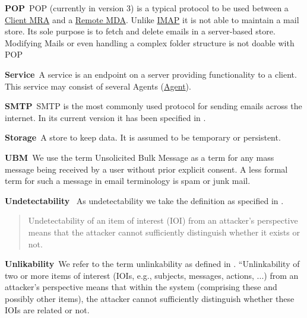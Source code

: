 \documentclass[a4paper,appendixprefix,pdfusetitle,twocolumn,fontsize=8pt,draft,DIV=calc]{scrbook}
\newenvironment{entry}{\par\leavevmode\hangpara{1.5mm}{1}\ignorespaces}{\RaggedRight\par}
\newcommand*{\mainentry}[2]{{\bfseries{#1\label{def:#1}}}~#2\par}
\newcommand*{\defref}[1]{\hyperref[def:#1]{#1}}
\begin{document}
\begin{entry}
	\mainentry{POP}{POP (currently in version 3) is a typical protocol to be used between a \defref{Client MRA} and a \defref{Remote MDA}. Unlike \defref{IMAP} it is not able to maintain a mail store. Its sole purpose is to fetch and delete emails in a server-based store. Modifying Mails or even handling a complex folder structure is not doable with POP}
\end{entry}

\begin{entry}
	\mainentry{Service}{A service is an endpoint on a server providing functionality to a client. This service may consist of several Agents (\defref{Agent}).}
\end{entry}

\begin{entry}
	\mainentry{SMTP}{SMTP is the most commonly used protocol for sending emails across the internet. In its current version it has been specified in \cite{RFC5321}.}
\end{entry}

\begin{entry}
	\mainentry{Storage}{A store to keep data. It is assumed to be temporary or persistent.}
\end{entry}

\begin{entry}
	\mainentry{UBM}{We use the term Unsolicited Bulk Message as a term for any mass message being received by a user without prior explicit consent. A less formal term for such a message in email terminology is spam or junk mail.}
\end{entry}

\begin{entry}
	\mainentry{Undetectability}{
		As undetectability we take the definition as specified in \cite{anonTerminology}.
		\begin{quote}
			Undetectability of an item of interest (IOI\index{Item of Interest}) from an attacker's perspective means that the
			attacker cannot sufficiently distinguish whether it exists or not.\omitted
		\end{quote}
	}
\end{entry}

\begin{entry}
	\mainentry{Unlikability}{We refer to the term unlinkability as defined in \cite{anonTerminology}. ``Unlinkability of two or more items of interest (IOIs, e.g., subjects, messages, actions, ...) from an attacker’s perspective means that within the system (comprising these and possibly other items), the attacker cannot sufficiently distinguish whether these IOIs are 
		related or not.}
\end{entry}
\end{document}
